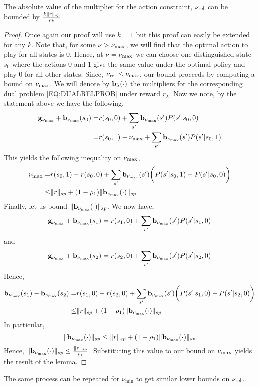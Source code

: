 \begin{lemma}\label{LEM:LAGBOUND}
    The absolute value of the multiplier for the action constraint, $\mathbf{\nu_{\text{rel}}}$ can be bounded by $\frac{k\|r\|_{sp}}{\rho_{k}}$
\end{lemma}
\begin{proof}
    Once again our proof will use $k = 1$ but this proof can easily be extended for any $k$. Note that, for some $\nu > \mathbf{\nu_{\text{max}}}$, we will find that the optimal action to play for all states is $0$. Hence, at $\nu = \mathbf{\nu_{\text{max}}}$ we can choose one distinguished state $s_0$ where the actions $0$ and $1$ give the same value under the optimal policy and play $0$ for all other states. Since, $\mathbf{\nu_{\text{rel}}} \leq \mathbf{\nu_{\text{max}}}$, our bound proceeds by computing a bound on $\mathbf{\nu_{\text{max}}}$. We will denote by $\mathbf{b}_{\lambda}(\cdot)$ the multipliers for the corresponding dual problem \eqref{EQ:DUALRELPROB} under reward $r_{\lambda}$. Now we note, by the statement above we have the following,
    \begin{align*}
        \mathbf{g}_{\mathbf{\nu_{\text{max}}} } + \mathbf{b}_{\mathbf{\nu_{\text{max}}}}(s_0) =& r(s_0, 0) + \sum_{s'}\mathbf{b}_{\mathbf{\nu_{\text{max}}}}(s')P(s'|s_0, 0)\\
        =& r(s_0, 1) - \mathbf{\nu_{\text{max}}} + \sum_{s'}\mathbf{b}_{\mathbf{\nu_{\text{max}}}}(s')P(s'|s_0, 1)
    \end{align*}
    This yields the following inequality on $\mathbf{\nu_{\text{max}}}$,
    \begin{align*}
        \mathbf{\nu_{\text{max}}} =& r(s_0, 1) - r(s_0, 0) +  \sum_{s'}\mathbf{b}_{\mathbf{\nu_{\text{max}}}}(s')\bigg(P(s'|s_0, 1) - P(s'|s_0, 0) \bigg)\\
        \leq&  \|r\|_{sp} + (1 - \rho_1)\|\mathbf{b}_{\mathbf{\nu_{\text{max}}}}(\cdot)\|_{sp} 
    \end{align*}  
    Finally, let us bound $\|\mathbf{b}_{\mathbf{\nu_{\text{max}}}}(\cdot)\|_{sp}$. We now have,
    \[
    \mathbf{g}_{\mathbf{\nu_{\text{max}}} } + \mathbf{b}_{\mathbf{\nu_{\text{max}}}}(s_1) = r(s_1, 0) + \sum_{s'}\mathbf{b}_{\mathbf{\nu_{\text{max}}}}(s')P(s'|s_1, 0)
    \]
    and
    \[
    \mathbf{g}_{\mathbf{\nu_{\text{max}}} } + \mathbf{b}_{\mathbf{\nu_{\text{max}}}}(s_2) = r(s_2, 0) + \sum_{s'}\mathbf{b}_{\mathbf{\nu_{\text{max}}}}(s')P(s'|s_2, 0)
    \] 
    Hence,
    \begin{align*}
     \mathbf{b}_{\mathbf{\nu_{\text{max}}}}(s_1) - \mathbf{b}_{\mathbf{\nu_{\text{max}}}}(s_2) =& r(s_1, 0) - r(s_2, 0) + \sum_{s'}\mathbf{b}_{\mathbf{\nu_{\text{max}}}}(s')\bigg(P(s'|s_1, 0) - P(s'|s_2, 0)\bigg) \\
     \leq& \|r\|_{sp} + (1 - \rho_1)\|\mathbf{b}_{\mathbf{\nu_{\text{max}}}}(\cdot)\|_{sp}
    \end{align*}
    In particular,
    \[
    \|\mathbf{b}_{\mathbf{\nu_{\text{max}}}}(\cdot)\|_{sp} \leq \|r\|_{sp} + (1 - \rho_1)\|\mathbf{b}_{\mathbf{\nu_{\text{max}}}}(\cdot)\|_{sp}
    \]
    Hence, $\|\mathbf{b}_{\mathbf{\nu_{\text{max}}}}(\cdot)\|_{sp} \leq \frac{\|r\|_{sp}}{\rho_1}$. Substituting this value to our bound on $\mathbf{\nu_{\text{max}}}$ yields the result of the lemma. 
\end{proof}
The same process can be repeated for $\nu_{\text{min}}$ to get similar lower bounds on $\mathbf{\nu_{\text{rel}}}$.


